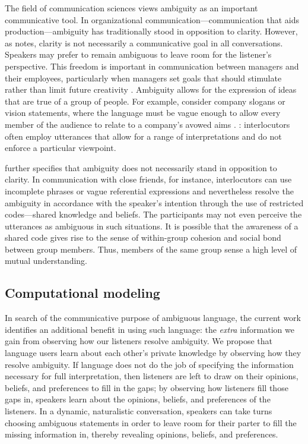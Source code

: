\documentclass[10pt,a4paper]{article}
\newcommand{\gcs}[1]{\textcolor{blue}{[gcs: #1]}}
\begin{document}
The field of communication sciences views ambiguity as an important communicative tool. %
In organizational communication---communication that aids production---ambiguity has traditionally stood in opposition to clarity. However, as  notes, clarity is not necessarily a communicative goal in all conversations. Speakers may prefer to remain ambiguous to leave room for the listener's perspective. This freedom is important in communication between managers and their employees, particularly when managers set goals that should stimulate rather than limit future creativity \cite{mohr1983implications}. Ambiguity allows for the expression of ideas that are true of a group of people. For example, consider company slogans or vision statements, where the language must be vague enough to allow every member of the audience to relate to a company's avowed aims \cite{carmon2013}. 
\cite{pascale1981art}: interlocutors often employ utterances that allow for a range of interpretations and do not enforce a particular viewpoint.

 further specifies that ambiguity does not necessarily stand in opposition to clarity. In communication with close friends, for instance, interlocutors can use incomplete phrases or vague referential expressions and nevertheless resolve the ambiguity in accordance with the speaker's intention through the use of restricted codes---shared knowledge and beliefs. The participants may not even perceive the utterances as ambiguous in such situations. It is possible that the awareness of a shared code gives rise to the sense of within-group cohesion and social bond between group members. Thus, members of the same group sense a high level of mutual understanding.

\subsection{Computational modeling}

In search of the communicative purpose of ambiguous language, the current work identifies an additional benefit in using such language: the \emph{extra} information we gain from observing how our listeners resolve ambiguity.
We propose that language users learn about each other's private knowledge by observing how they resolve ambiguity. If language does not do the job of specifying the information necessary for full interpretation, then listeners are left to draw on their opinions, beliefs, and preferences to fill in the gaps; by observing how listeners fill those gaps in, speakers learn about the opinions, beliefs, and preferences of the listeners.
In a dynamic, naturalistic conversation, speakers can take turns choosing ambiguous statements in order to leave room for their parter to fill the missing information in, thereby revealing opinions, beliefs, and preferences. 
\end{document}
